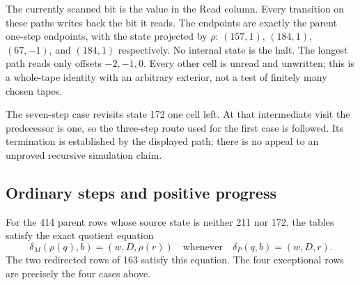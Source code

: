 \documentclass[11pt,letterpaper]{article}
\begin{document}
The currently scanned bit is the value in the Read column. Every transition
on these paths writes back the bit it reads. The endpoints are exactly the
parent one-step endpoints, with the state projected by $\rho$:
$(157,1)$, $(184,1)$, $(67,-1)$, and $(184,1)$ respectively.
No internal state is the halt. The longest path reads only offsets
$-2,-1,0$. Every other cell is unread and unwritten; this is a whole-tape
identity with an arbitrary exterior, not a test of finitely many chosen
tapes.

The seven-step case revisits state 172 one cell left. At that intermediate
visit the predecessor is one, so the three-step route used for the first
case is followed. Its termination is established by the displayed path;
there is no appeal to an unproved recursive simulation claim.

\subsection{Ordinary steps and positive progress}

For the 414 parent rows whose source state is neither 211 nor 172, the
tables satisfy the exact quotient equation
\begin{equation}\label{eq:ordinary}
\delta_M(\rho(q),b)=(w,D,\rho(r))
\quad\text{whenever}\quad\delta_P(q,b)=(w,D,r).
\end{equation}
The two redirected rows of 163 satisfy this equation. The four exceptional
rows are precisely the four cases above.
\end{document}
